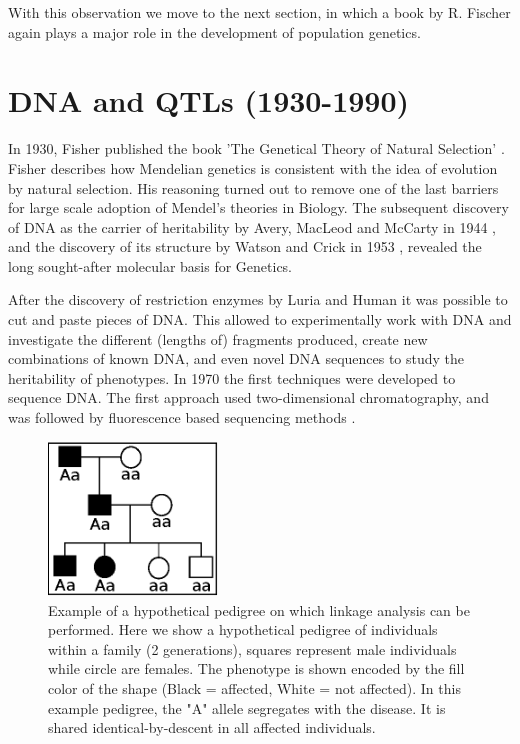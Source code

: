 With this observation we move to the next section, in which a book by R. Fischer again plays a major role in 
the development of population genetics.

\section{DNA and QTLs (1930-1990)}

In 1930, Fisher published the book 'The Genetical Theory of Natural Selection' \cite{Fisher:1930}. Fisher describes 
how Mendelian genetics is consistent with the idea of evolution by natural selection. His reasoning turned out 
to remove one of the last barriers for large scale adoption of Mendel's theories in Biology. The subsequent discovery 
of DNA as the carrier of heritability by Avery, MacLeod and McCarty in 1944 \cite{Avery:1944}, and the discovery of 
its structure by Watson and Crick in 1953 \cite{Watson:1953}, revealed the long sought-after molecular basis for Genetics. 

After the discovery of restriction enzymes by Luria and Human \cite{Luria:1952} it was possible to cut and paste pieces 
of DNA. This allowed to experimentally work with DNA and investigate the different (lengths of) fragments produced, 
create new combinations of known DNA, and even novel DNA sequences to study the heritability of phenotypes. In 1970 
the first techniques were developed to sequence DNA. The first approach used two-dimensional chromatography, and was 
followed by fluorescence based sequencing methods \cite{Pettersson:2009}.

\begin{figure}
  \centering
  \includegraphics[width=0.4\textwidth]{eps/image_1_2.eps}
  \caption[Example of pedigree based linkage analysis.]
    {Example of a hypothetical pedigree on which linkage analysis can be performed. Here we show a 
    hypothetical pedigree of individuals within a family (2 generations), squares represent 
    male individuals while circle are females. The phenotype is shown encoded by the fill 
    color of the shape (Black = affected, White = not affected).  In this example pedigree, 
    the "A" allele segregates with the disease. It is shared identical-by-descent in all 
    affected individuals. }
    \label{fig:pedigree}
\end{figure}

